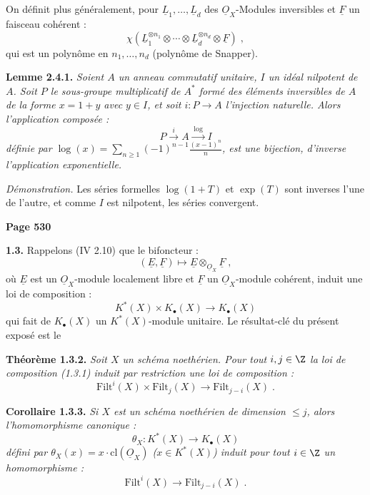 On d\'efinit plus g\'en\'eralement, pour $\underline{L}_1, \ldots, \underline{L}_d$ des $\underline{O}_X$-Modules inversibles et $\underline{F}$ un faisceau coh\'erent :
\[
\chi(\underline{L}_1^{\otimes n_1} \otimes \cdots \otimes \underline{L}_d^{\otimes n_d} \otimes \underline{F})\;,
\]
qui est un polyn\^ome en $n_1, \ldots, n_d$ (polyn\^ome de Snapper).

\smallskip
\noindent\textbf{Lemme 2.4.1.} \textit{Soient $A$ un anneau commutatif unitaire, $I$ un id\'eal nilpotent de $A$. Soit $P$ le sous-groupe multiplicatif de $A^*$ form\'e des \'el\'ements inversibles de $A$ de la forme $x = 1+y$ avec $y \in I$, et soit $i : P \longrightarrow A$ l'injection naturelle. Alors l'application compos\'ee :
\[
P \xrightarrow{\;i\;} A \xrightarrow{\;\log\;} I
\]
d\'efinie par $\log(x) = \sum_{n \geq 1} (-1)^{n-1} \frac{(x-1)^n}{n}$, est une bijection, d'inverse l'application exponentielle.}

\textit{D\'emonstration.} Les s\'eries formelles $\log(1+T)$ et $\exp(T)$ sont inverses l'une de l'autre, et comme $I$ est nilpotent, les s\'eries convergent.

\newpage
\noindent\textbf{Page 530}

\smallskip
\noindent\textbf{1.3.} Rappelons (IV 2.10) que le bifoncteur :
\[
(\underline{E}, \underline{F}) \longmapsto \underline{E} \otimes_{\underline{O}_X} \underline{F}\;,
\]
o\`u $\underline{E}$ est un $\underline{O}_X$-module localement libre et $\underline{F}$ un $\underline{O}_X$-module coh\'erent, induit une loi de composition :
\begin{equation}\tag{1.3.1}
K^*(X) \times K_\bullet(X) \longrightarrow K_\bullet(X)
\end{equation}
qui fait de $K_\bullet(X)$ un $K^*(X)$-module unitaire. Le r\'esultat-cl\'e du pr\'esent expos\'e est le

\smallskip
\noindent\textbf{Th\'eor\`eme 1.3.2.} \textit{Soit $X$ un sch\'ema noeth\'erien. Pour tout $i, j \in \Z$ la loi de composition (1.3.1) induit par restriction une loi de composition :
\begin{equation}\tag{1.3.3}
\mathrm{Filt}^i(X) \times \mathrm{Filt}_j(X) \longrightarrow \mathrm{Filt}_{j-i}(X)\;.
\end{equation}}

\smallskip
\noindent\textbf{Corollaire 1.3.3.} \textit{Si $X$ est un sch\'ema noeth\'erien de dimension $\leq j$, alors l'homomorphisme canonique :
\[
\theta_X : K^*(X) \longrightarrow K_\bullet(X)
\]
d\'efini par $\theta_X(x) = x \cdot \mathrm{cl}(\underline{O}_X)$ ($x \in K^*(X)$) induit pour tout $i \in \Z$ un homomorphisme :
\[
\mathrm{Filt}^i(X) \longrightarrow \mathrm{Filt}_{j-i}(X)\;.
\]}

